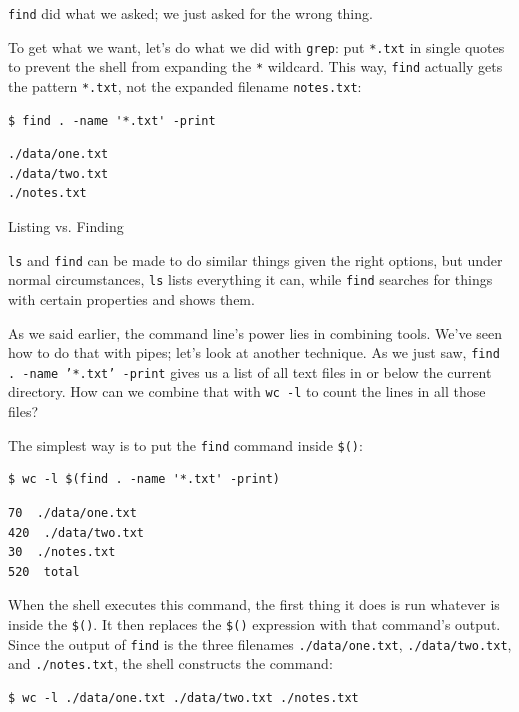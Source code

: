 \documentclass{book}
\begin{document}
\texttt{find} did what we asked; we just asked for the wrong thing.

To get what we want, let's do what we did with \texttt{grep}: put
\texttt{*.txt} in single quotes to prevent the shell from expanding the
\texttt{*} wildcard. This way, \texttt{find} actually gets the pattern
\texttt{*.txt}, not the expanded filename \texttt{notes.txt}:

\begin{verbatim}
$ find . -name '*.txt' -print
\end{verbatim}

\begin{verbatim}
./data/one.txt
./data/two.txt
./notes.txt
\end{verbatim}

\begin{swcbox}{Listing vs. Finding}

\texttt{ls} and \texttt{find} can be made to do similar things given the
right options, but under normal circumstances, \texttt{ls} lists
everything it can, while \texttt{find} searches for things with certain
properties and shows them.

\end{swcbox}

As we said earlier, the command line's power lies in combining tools.
We've seen how to do that with pipes; let's look at another technique.
As we just saw, \texttt{find . -name '*.txt' -print} gives us a list of
all text files in or below the current directory. How can we combine
that with \texttt{wc -l} to count the lines in all those files?

The simplest way is to put the \texttt{find} command inside
\texttt{\$()}:

\begin{verbatim}
$ wc -l $(find . -name '*.txt' -print)
\end{verbatim}

\begin{verbatim}
70  ./data/one.txt
420  ./data/two.txt
30  ./notes.txt
520  total
\end{verbatim}

When the shell executes this command, the first thing it does is run
whatever is inside the \texttt{\$()}. It then replaces the \texttt{\$()}
expression with that command's output. Since the output of \texttt{find}
is the three filenames \texttt{./data/one.txt}, \texttt{./data/two.txt},
and \texttt{./notes.txt}, the shell constructs the command:

\begin{verbatim}
$ wc -l ./data/one.txt ./data/two.txt ./notes.txt
\end{verbatim}
\end{document}
